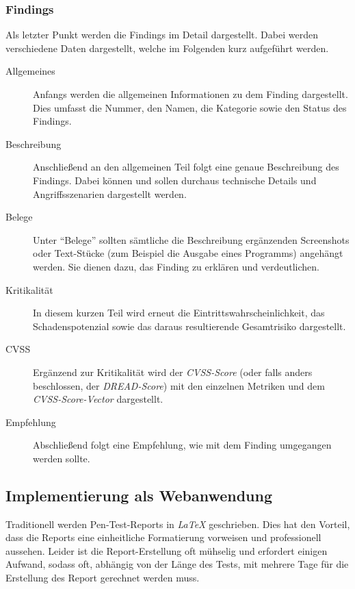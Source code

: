	\subsubsection{Findings}\label{ref:penBerFind}
	Als letzter Punkt werden die Findings im Detail dargestellt. Dabei werden verschiedene Daten dargestellt, welche im Folgenden kurz aufgeführt werden.
	\begin{description}
		\item[Allgemeines] Anfangs werden die allgemeinen Informationen zu dem Finding dargestellt. Dies umfasst die Nummer, den Namen, die Kategorie sowie den Status des Findings.
		
		\item[Beschreibung] Anschließend an den allgemeinen Teil folgt eine genaue Beschreibung des Findings. Dabei können und sollen durchaus technische Details und Angriffsszenarien dargestellt werden.
		
		\item[Belege] Unter "`Belege"' sollten sämtliche die Beschreibung ergänzenden Screenshots oder Text-Stücke (zum Beispiel die Ausgabe eines Programms) angehängt werden. Sie dienen dazu, das Finding zu erklären und verdeutlichen.
		\item[Kritikalität] In diesem kurzen Teil wird erneut die Eintrittswahrscheinlichkeit, das Schadenspotenzial sowie das daraus resultierende Gesamtrisiko dargestellt.
		
		\item[CVSS] Ergänzend zur Kritikalität wird der \textit{CVSS-Score} (oder falls anders beschlossen, der \textit{DREAD-Score}) mit den einzelnen Metriken und dem \textit{CVSS-Score-Vector} dargestellt.
		
		\item[Empfehlung] Abschließend folgt eine Empfehlung, wie mit dem Finding umgegangen werden sollte.
	\end{description}

	
	
	\subsection{Implementierung als Webanwendung}\label{ref:PenProzReportWeb}
	Traditionell werden Pen-Test-Reports in \textit{LaTeX} geschrieben. Dies hat den Vorteil, dass die Reports eine einheitliche Formatierung vorweisen und professionell aussehen. Leider ist die Report-Erstellung oft mühselig und erfordert einigen Aufwand, sodass oft, abhängig von der Länge des Tests, mit mehrere Tage für die Erstellung des Report gerechnet werden muss.\\
	
